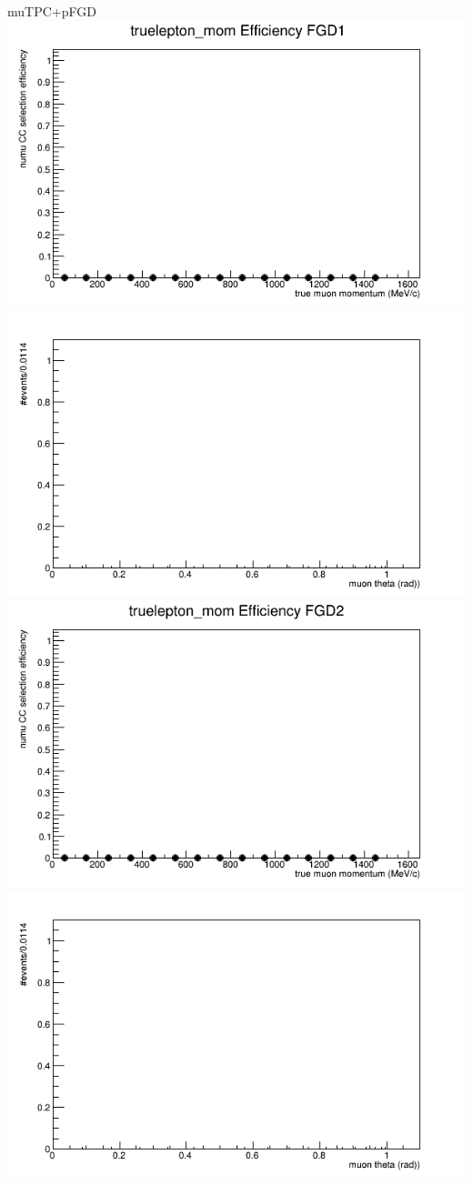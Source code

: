 \documentclass{beamer}
\begin{document}
\begin{frame}{muTPC+pFGD}
\center
\includegraphics[width=.45\textwidth]{images/Eff_truelepton_mom_topology_muTPC+pFGD_accum_level[][0][29]_data_mc.png}
\includegraphics[width=.45\textwidth]{images/Eff_truelepton_costheta_topology_muTPC+pFGD_accum_level[][0][29]_data_mc.png}
\includegraphics[width=.45\textwidth]{images/Eff_truelepton_mom_fgd2topology_muTPC+pFGD_accum_level[][1][29]_data_mc.png}
\includegraphics[width=.45\textwidth]{images/Eff_truelepton_costheta_fgd2topology_muTPC+pFGD_accum_level[][1][29]_data_mc.png}
\end{frame}
\end{document}
